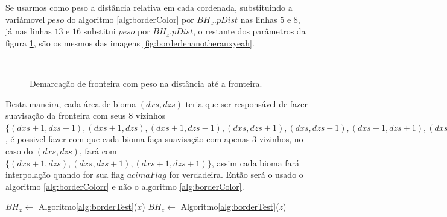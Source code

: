 Se usarmos como peso a distância relativa em cada cordenada, substituindo a variámovel
$peso$ do algoritmo \ref{alg:borderColor} por $BH_{x}.pDist$ nas linhas $5$ e $8$, já
nas linhas $13$ e $16$ substitui $peso$ por $BH_{z}.pDist$, o restante dos parâmetros
da figura \ref{fig:borderlenanotherauxyeahp}, são os mesmos das imagens \ref{fig:borderlenanotherauxyeah}.

\begin{figure}[H]
     \centering
     \hspace{0.1cm}
     \\
     \caption{Demarcação de fronteira com peso na distância até a fronteira.}
     
     \label{fig:borderlenanotherauxyeahp}
\end{figure}

Desta maneira, cada área de bioma $(dxs, dzs)$ teria que ser responsável de fazer suavisação da 
fronteira com seus $8$ vizinhos 
$\{(dxs+1, dzs+1), (dxs+1, dzs), (dxs+1, dzs-1), (dxs, dzs+1), (dxs, dzs-1), (dxs-1, dzs+1), (dxs-1, dzs), (dxs-1, dzs-1)\}$
, é possivel fazer com que cada bioma faça suavisação com apenas 3 vizinhos, no caso do 
$(dxs, dzs)$, fará com $\{(dxs+1, dzs), (dxs, dzs+1), (dxs+1, dzs+1)\}$, assim cada 
bioma fará interpolação quando for sua flag $acimaFlag$ for verdadeira. Então
será o usado o algoritmo \ref{alg:borderColorr} e não o algoritmo \ref{alg:borderColor}.

\begin{algorithm}[H]\label{alg:borderColorr}%
    $BH_{x} \leftarrow$ Algoritmo\ref{alg:borderTest}($x$)\;
    $BH_{z} \leftarrow$ Algoritmo\ref{alg:borderTest}($z$)\;
    
    
    \caption{Colorindo fronteira apenas acima.}
\end{algorithm}

